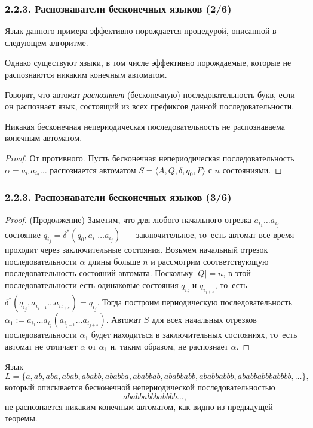 \documentclass[mathserif,12pt,aspectratio=169]{beamer}
\renewcommand{\index}[1]{}
\def\odmkey#1#2{{\it\color{red} #1}\index{#2}}
\def\Assign{\operatorname{:=}}
\begin{document}
\begin{frame}
\frametitle{2.2.3. Распознаватели бесконечных языков (2/6)}

Язык данного примера эффективно порождается процедурой, описанной
в следующем алгоритме.


\begin{algorithmic}
\STATE{\textbf {$\alpha\Assign\varepsilon$}}
  \STATE{\textbf{$\alpha\Assign\alpha+  ``aba"$}}
\ENDWHILE
\end{algorithmic}

Однако существуют языки, в том числе эффективно порождаемые,
которые не распознаются никаким конечным автоматом.

Говорят, что автомат \odmkey{распознает}{Распознавание!последовательности }
(бесконечную) последовательность
букв, если он распознает язык, состоящий из всех префиксов данной
последовательности.

\begin{theorem}
Никакая бесконечная непериодическая последовательность не
распознаваема конечным автоматом.
\end{theorem}

\begin{proof}
От противного. Пусть бесконечная непериодическая
последовательность
$
\alpha= a_{i_1} a_{i_2}\dots
$
распознается
автоматом $S=\langle A,Q,\delta,q_0,F\rangle$
 с $n$ состояниями. 
\end{proof}  
\end{frame}

\begin{frame}
\frametitle{2.2.3. Распознаватели бесконечных языков (3/6)}
\begin{proof} (Продолжение)
 Заметим, что для любого начального отрезка
 $a_{i_1}\dots a_{i_j}$ состояние $q_{i_j}=\delta^*(q_0, a_{i_1}\dots
 a_{i_j})$~--- заключительное, то~есть автомат все время проходит
 через заключительные состояния. Возьмем начальный отрезок
 последовательности $\alpha$ длины больше $n$ и рассмотрим
 соответствующую последовательность состояний автомата. Поскольку
 $|Q|=n$, в этой последовательности есть одинаковые состояния
 $q_{i_j}$ и $q_{i_{j+s}}$,
 то~есть $\delta^*(q_{i_j}, a_{i_{j+1}}\dots a_{i_{j+s}})=
 q_{i_j}$. Тогда построим периодическую последовательность
 $\alpha_1\Assign a_{i_1}\dots a_{i_j}(a_{i_{j+1}}\dots
 a_{i_{j+s}})$.
Автомат $S$  для всех начальных отрезков последовательности
$\alpha_1$ будет находиться в заключительных состояниях, то~есть
автомат не отличает $\alpha$ от $\alpha_1$ и, таким образом, не
распознает $\alpha$.
 \end{proof}

\begin{example}
Язык
$$
L=\{a, ab, aba, abab, ababb, ababba, ababbab,ababbabb,
ababbabbb, ababbabbbabbbb, \dots\},$$
который описывается бесконечной
непериодической последовательностью
$$
ababbabbbabbbb \dots,$$
не распознается никаким
конечным автоматом, как видно из предыдущей теоремы.
\end{example}
\end{frame}
\end{document}
